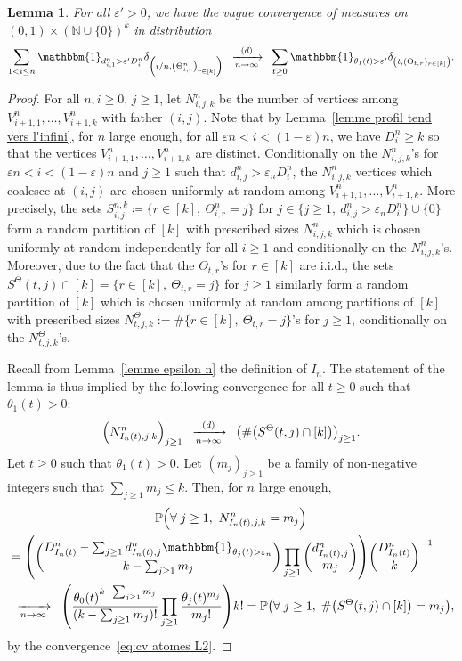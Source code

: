 \documentclass[10pt]{amsart}
\newtheorem{lemm}[theo]{Lemma}\newtheorem{prop}[theo]{Proposition}\newtheorem{coro}[theo]{Corollary}\newtheorem{conj}[theo]{Conjecture}
\theoremstyle{definition}\newtheorem{defi}[theo]{Definition}\newtheorem{rema}[theo]{Remark}\newtheorem{exam}[theo]{Example}\newtheorem{exem}[theo]{Example}\newtheorem{nota}[theo]{Notation}
\newcommand{\e}{\varepsilon}
\newcommand{\cv}[1][n]{\enskip\xrightarrow[#1 \to \infty]{}\enskip}
\newcommand{\cvloi}[1][n]{\enskip\xrightarrow[#1 \to \infty]{(d)}\enskip}
\newcommand{\N}{\mathbb{N}}
\renewcommand{\P}{{\mathbb{P}}}
\newcommand{\1}{\mathbbm{1}}
\let\originalleft\left
\let\originalright\right
\renewcommand{\left}{\mathopen{}\mathclose\bgroup\originalleft}
\renewcommand{\right}{\aftergroup\egroup\originalright}
\renewcommand*{\to}{\mathchoice{\longrightarrow}{\rightarrow}{\rightarrow}{\rightarrow}}
\let\oldforall\forall
\renewcommand*{\forall}{\mathrel{\oldforall}}
\begin{document}
\begin{lemm}\label{lem: cv grandes coalescences}
For all $\e'>0$, we have the {vague} convergence of measures on $(0,1)\times (\N\cup \{0\})^k$ in distribution
\[
\sum_{1 < i \le n}
\1_{d^n_{i,1}>\e' D^n_i} \delta_{\left(i/n, \left(\Theta^n_{i,r}\right)_{r \in [k]}\right)}
\cvloi[n]
\sum_{t\ge 0} \1_{\theta_1(t)>\e'}\delta_{\left(t,(\Theta_{t,r})_{r \in [k]}\right)}.
\]
\end{lemm}
\begin{proof}
For all $n,i\ge 0$, $j\ge 1$, let $N^n_{i,j,k}$ be the number of vertices among $V^n_{i+1,1}, \dots, V^n_{i+1,k}$ with father $(i,j)$. Note that by Lemma~\ref{lemme profil tend vers l'infini}, for $n$ large enough, for all $\e n < i < (1- \e) n $, we have $D^n_i \ge k$ so that the vertices $V^n_{i+1,1}, \dots, V^n_{i+1,k}$ are distinct. Conditionally on the $N^n_{i,j,k}$'s for $\e n < i < (1- \e) n $ and $j\ge 1$ such that $d^n_{i,j}>\e_n D^n_i$, the $N^n_{i,j,k}$ vertices which coalesce at $(i,j)$ are chosen uniformly at random among $V^n_{i+1,1}, \dots, V^n_{i+1,k}$. More precisely, the sets $S^{n,k}_{i,j}\coloneqq \{ r \in [k], \ \Theta^n_{i,r} = j\}$ for $j \in \{j \ge 1, \ d^n_{i,j} > \e_n D^n_i \}\cup \{0\}$ form a random partition of $[k]$ with prescribed sizes $N^n_{i,j,k}$ which is chosen uniformly at random independently for all $i\ge 1$ and conditionally on the $N^n_{i,j,k}$'s. Moreover, due to the fact that the $\Theta_{t,r}$'s for $r\in [k]$ are i.i.d., the sets $S^\Theta(t,j) \cap [k]= \{r \in [k], \ \Theta_{t,r}=j \}$ for $j\ge 1$ similarly form a random partition of $[k]$ which is chosen uniformly at random among partitions of $[k]$ with prescribed sizes $N_{t,j,k}^\Theta:=\#\{r\in [k], \ \Theta_{t,r}= j \}$'s for $j\ge 1$, conditionally on the $N_{t,j,k}^\Theta$'s.

Recall from Lemma~\ref{lemme epsilon n} the definition of $I_n$. The statement of the lemma is thus implied by the following convergence for all $t\ge 0$ such that $\theta_1(t)>0$:
\begin{equation}\label{eq:convergence N_IJ}
\left(N^n_{I_n(t), j,k}
\right)_{j\ge 1}
\cvloi[n] \left(\# \left(S^\Theta(t,j) \cap [k]\right)\right)_{j\ge 1}.
\end{equation}
Let $t\ge 0$ such that $\theta_1(t)>0$. Let $(m_j)_{j\ge 1}$ be a family of non-negative integers such that $\sum_{j\ge 1} m_j \le k$. Then, for $n$ large enough,
\begin{multline*}
\P\left(
\forall j\ge 1,
\ N^n_{I_n(t),j,k} = m_j
\right) \\
\begin{aligned}
&=
\left({\binom{D^n_{I_n(t)}-\sum_{j\ge 1} d^n_{I_n(t), j}\1_{\theta_j(t)>\e_n}}{k-\sum_{j\ge 1} m_j}\prod_{j\ge 1} \binom{d^n_{I_n(t),j}}{m_j}}\right){\binom{D^n_{I_n(t)}}{k}}^{-1}
\\
&\cv[n] \left(
\frac{\theta_0(t)^{k-\sum_{j\ge 1} m_j}}{(k-\sum_{j\ge 1} m_j)!}
\prod_{j\ge 1} \frac{\theta_j(t)^{m_j}}{m_j!}
\right) {k!}=\P\left(
\forall j \ge 1, \; \# \left(S^\Theta(t,j) \cap [k]\right)= m_j
\right),
\end{aligned}
\end{multline*}
by the convergence~\eqref{eq:cv atomes L2}.
\end{proof}
\end{document}
